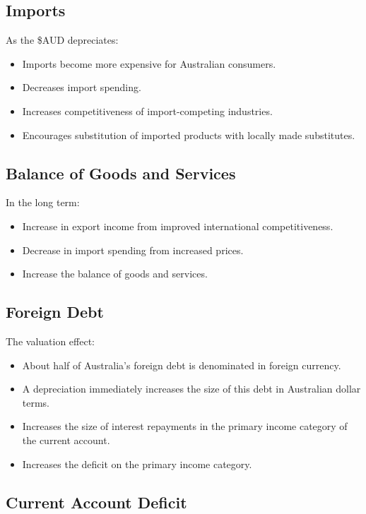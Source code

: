 \documentclass[a4paper,11pt]{article}
\begin{document}
\subsection{Imports}

As the \$AUD depreciates:

\begin{itemize}
\item Imports become more expensive for Australian consumers.
\item Decreases import spending.
\item Increases competitiveness of import-competing industries.
\item Encourages substitution of imported products with locally made
	substitutes.
\end{itemize}


\subsection{Balance of Goods and Services}

In the long term:

\begin{itemize}
\item Increase in export income from improved international competitiveness.
\item Decrease in import spending from increased prices.
\item Increase the balance of goods and services.
\end{itemize}


\subsection{Foreign Debt}

The valuation effect:

\begin{itemize}
\item About half of Australia's foreign debt is denominated in foreign currency.
\item A depreciation immediately increases the size of this debt in Australian
	dollar terms.
\item Increases the size of interest repayments in the primary income category
	of the current account.
\item Increases the deficit on the primary income category.
\end{itemize}


\subsection{Current Account Deficit}
\end{document}
